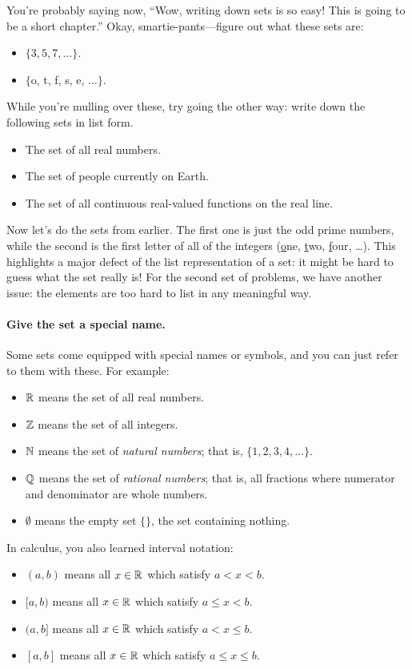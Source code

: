 \documentclass{tufte-book}
\begin{document}
You're probably saying now, ``Wow, writing down sets is so easy! This is going to be a short chapter.'' Okay, smartie-pants---figure out what these sets are:
\begin{itemize}
    \item $\{3, 5, 7, \dots\}$.
    \item $\{$o, t, f, s, e, $\dots\}$.
\end{itemize}
While you're mulling over these, try going the other way: write down the following sets in list form.
\begin{itemize}
    \item The set of all real numbers.
    \item The set of people currently on Earth.
    \item The set of all continuous real-valued functions on the real line.
\end{itemize}
Now let's do the sets from earlier. The first one is just the odd prime numbers, while the second is the first letter of all of the integers (\underline{o}ne, \underline{t}wo, \underline{f}our, \dots). This highlights a major defect of the list representation of a set: it might be hard to guess what the set really is! For the second set of problems, we have another issue: the elements are too hard to list in any meaningful way.

\paragraph{Give the set a special name.}
\label{sec:give-set-special}

Some sets come equipped with special names or symbols, and you can just refer to them with these. For example:
\begin{itemize}
    \item $\mathbb{R}$ means the set of all real numbers.
    \item $\mathbb{Z}$ means the set of all integers.
    \item $\mathbb{N}$ means the set of \emph{natural numbers}; that is, $\{1, 2, 3, 4, \dots\}$.
    \item $\mathbb{Q}$ means the set of \emph{rational numbers}; that is, all fractions where numerator and denominator are whole numbers.
    \item $\emptyset$ means the empty set $\{\}$, the set containing nothing.
\end{itemize}
In calculus, you also learned interval notation:
\begin{itemize}
    \item $(a,b)$ means all $x \in \mathbb{R}$ which satisfy $a < x < b$.
    \item $[a,b)$ means all $x \in \mathbb{R}$ which satisfy $a \leq x < b$.
    \item $(a,b]$ means all $x \in \mathbb{R}$ which satisfy $a < x \leq b$.
    \item $[a,b]$ means all $x \in \mathbb{R}$ which satisfy $a \leq x \leq b$.
\end{itemize}
\end{document}
